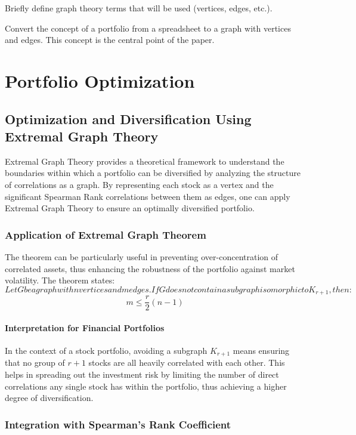 \documentclass{article}
\begin{document}
Briefly define graph theory terms that will be used (vertices, edges, etc.). 


Convert the concept of a portfolio from a spreadsheet to a graph with vertices and edges. This concept is the central point of the paper.



\section{Portfolio Optimization}

\subsection{Optimization and Diversification Using Extremal Graph Theory}

Extremal Graph Theory provides a theoretical framework to understand the boundaries within which a portfolio can be diversified by analyzing the structure of correlations as a graph. By representing each stock as a vertex and the significant Spearman Rank correlations between them as edges, one can apply Extremal Graph Theory to ensure an optimally diversified portfolio.

\subsubsection{Application of Extremal Graph Theorem}

The theorem can be particularly useful in preventing over-concentration of correlated assets, thus enhancing the robustness of the portfolio against market volatility. The theorem states:
\[
{Let } G { be a graph with } n { vertices and } m { edges. If } G { does not contain a subgraph isomorphic to } K_{r+1}, { then: }
\]
\[
m \leq \frac{r}{2} (n-1)
\]

\paragraph{Interpretation for Financial Portfolios}
In the context of a stock portfolio, avoiding a subgraph $K_{r+1}$ means ensuring that no group of $r+1$ stocks are all heavily correlated with each other. This helps in spreading out the investment risk by limiting the number of direct correlations any single stock has within the portfolio, thus achieving a higher degree of diversification.

\subsubsection{Integration with Spearman's Rank Coefficient}
\end{document}
